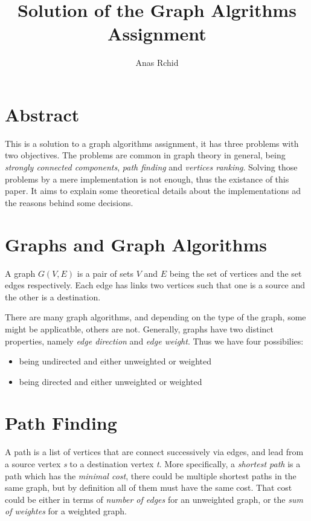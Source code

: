 \documentclass[12pt]{article}
\title{Solution of the Graph Algrithms Assignment}
\author{Anas Rchid}
\begin{document}
\maketitle

\section*{Abstract}

This is a solution to a graph algorithms assignment, it has three problems with two objectives. The problems are common in graph theory in general, being \textit{strongly connected components}, \textit{path finding} and \textit{vertices ranking}. Solving those problems by a mere implementation is not enough, thus the existance of this paper. It aims to explain some theoretical details about the implementations ad the reasons behind some decisions.

\section{Graphs and Graph Algorithms}

A graph $G(V,E)$ is a pair of sets $V$ and $E$ being the set of vertices and the set edges respectively. Each edge has links two vertices such that one is a source and the other is a destination.

There are many graph algorithms, and depending on the type of the graph, some might be applicatble, others are not.  Generally, graphs have two distinct properties, namely \textit{edge direction} and \textit{edge weight}. Thus we have four possibilies:

\begin{itemize}
\item being undirected and either unweighted or weighted
\item being directed and either unweighted or weighted
\end{itemize}

\section{Path Finding}

A path is a list of vertices that are connect successively via edges, and lead from a source vertex \textit{s} to a destination vertex \textit{t}. More specifically, a \textit{shortest path} is a path which has the \textit{minimal cost}, there could be multiple shortest paths in the same graph, but by definition all of them must have the same cost. That cost could be either in terms of \textit{number of edges} for an unweighted graph, or the \textit{sum of weightes} for a weighted graph.
\end{document}
